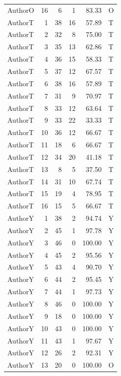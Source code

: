\begin{longtable}{lrrrrl}
AuthorO & 16 & 6 & 1 & 83.33 & O\\
AuthorT & 1 & 38 & 16 & 57.89 & T\\
AuthorT & 2 & 32 & 8 & 75.00 & T\\
AuthorT & 3 & 35 & 13 & 62.86 & T\\
AuthorT & 4 & 36 & 15 & 58.33 & T\\
AuthorT & 5 & 37 & 12 & 67.57 & T\\
AuthorT & 6 & 38 & 16 & 57.89 & T\\
AuthorT & 7 & 31 & 9 & 70.97 & T\\
AuthorT & 8 & 33 & 12 & 63.64 & T\\
AuthorT & 9 & 33 & 22 & 33.33 & T\\
AuthorT & 10 & 36 & 12 & 66.67 & T\\
AuthorT & 11 & 18 & 6 & 66.67 & T\\
AuthorT & 12 & 34 & 20 & 41.18 & T\\
AuthorT & 13 & 8 & 5 & 37.50 & T\\
AuthorT & 14 & 31 & 10 & 67.74 & T\\
AuthorT & 15 & 19 & 4 & 78.95 & T\\
AuthorT & 16 & 15 & 5 & 66.67 & T\\
AuthorY & 1 & 38 & 2 & 94.74 & Y\\
AuthorY & 2 & 45 & 1 & 97.78 & Y\\
AuthorY & 3 & 46 & 0 & 100.00 & Y\\
AuthorY & 4 & 45 & 2 & 95.56 & Y\\
AuthorY & 5 & 43 & 4 & 90.70 & Y\\
AuthorY & 6 & 44 & 2 & 95.45 & Y\\
AuthorY & 7 & 44 & 1 & 97.73 & Y\\
AuthorY & 8 & 46 & 0 & 100.00 & Y\\
AuthorY & 9 & 18 & 0 & 100.00 & Y\\
AuthorY & 10 & 43 & 0 & 100.00 & Y\\
AuthorY & 11 & 43 & 1 & 97.67 & Y\\
AuthorY & 12 & 26 & 2 & 92.31 & Y\\
AuthorY & 13 & 20 & 0 & 100.00 & O\\
\bottomrule\end{longtable}

